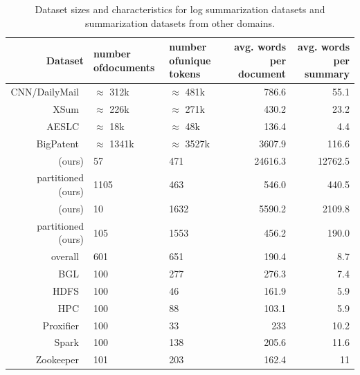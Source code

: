 \begin{table}[htbp]
\centering
\footnotesize
\begin{tabularx}{\textwidth}{rXXRR}
\toprule
Dataset                                       & number of\linebreak{}documents   & number of\linebreak{}unique tokens & avg. words per document & avg. words per summary\\
\midrule
CNN/DailyMail~\parencite{cnn_dailymail}       & \(\approx\) 312k  & \(\approx\) 481k    & 786.6                   & 55.1\\
XSum~\parencite{xsum}                         & \(\approx\) 226k  & \(\approx\) 271k    & 430.2                   & 23.2\\
AESLC~\parencite{aeslc}                       & \(\approx\) 18k   & \(\approx\) 48k     & 136.4                   & 4.4\\
BigPatent~\parencite{bigpatent}               & \(\approx\) 1341k & \(\approx\) 3527k   & 3607.9                  & 116.6\\
\midrule
\hadoop{} (ours)                              & 57                & 471                 & 24616.3                 & 12762.5\\
partitioned \hadoop{} (ours)                  & 1105              & 463                 & 546.0                   & 440.5\\
\telco{} (ours)                               & 10                & 1632                & 5590.2                  & 2109.8\\
partitioned \telco{} (ours)                   & 105               & 1553                & 456.2                   & 190.0\\
\midrule[.1pt]
\logsummary{} overall~\parencite{log_summary} & 601               & 651                 & 190.4                   & 8.7\\
BGL~\parencite{log_summary}                   & 100               & 277                 & 276.3                   & 7.4\\
HDFS~\parencite{log_summary}                  & 100               & 46                  & 161.9                   & 5.9\\
HPC~\parencite{log_summary}                   & 100               & 88                  & 103.1                   & 5.9\\
Proxifier~\parencite{log_summary}             & 100               & 33                  & 233                     & 10.2\\
Spark~\parencite{log_summary}                 & 100               & 138                 & 205.6                   & 11.6\\
Zookeeper~\parencite{log_summary}             & 101               & 203                 & 162.4                   & 11\\
\bottomrule
\end{tabularx}
\caption{Dataset sizes and characteristics for log summarization datasets and summarization datasets from other domains.}
\label{tab:other_domains_vs_log_datasets}
\end{table}

